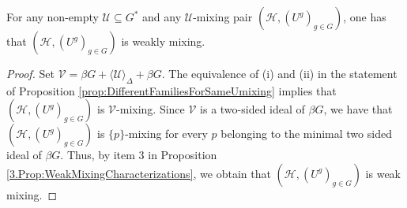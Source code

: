 \documentclass[graybox]{svmult}
\theoremstyle{definition}
\begin{document}
\begin{corollary}\label{3.cor:UmixingIsWeakMixing}
For any non-empty $\mathcal U\subseteq G^*$ and any $\mathcal U$-mixing pair $(\mathcal H,(U^g)_{g\in G})$, one  has that $(\mathcal H,(U^g)_{g\in G})$ is weakly mixing.
\end{corollary}
\begin{proof}
Set $\mathcal V=\beta G+\langle \mathcal U\rangle_{\Delta}+\beta G$. The equivalence of (i) and (ii) in the statement of Proposition \ref{prop:DifferentFamiliesForSameUmixing} implies that $(\mathcal H,(U^g)_{g\in G})$ is $\mathcal V$-mixing. Since $\mathcal V$ is a  two-sided ideal of $\beta G$, we have that $(\mathcal H,(U^g)_{g\in G})$ is $\{p\}$-mixing for every $p$ belonging to the minimal two sided ideal of $\beta G$. Thus,  by item 3 in Proposition \ref{3.Prop:WeakMixingCharacterizations}, we obtain that $(\mathcal H,(U^g)_{g\in G})$ is weak mixing. 
\end{proof}
\end{document}
